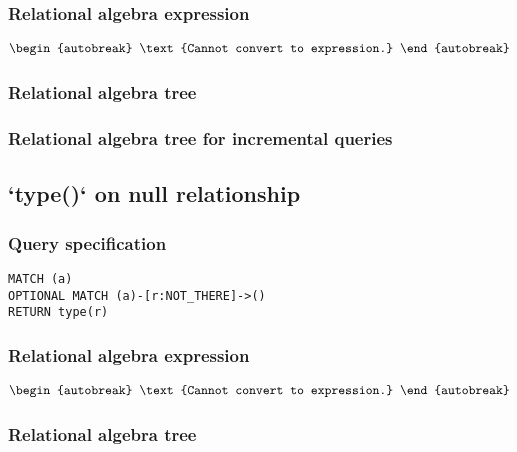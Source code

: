 \subsubsection*{Relational algebra expression}

\begin{align*}
\begin{autobreak}
\text{Cannot convert to expression.}
\end{autobreak}
\end{align*}

\subsubsection*{Relational algebra tree}


\subsubsection*{Relational algebra tree for incremental queries}


\subsection{`type()` on null relationship}

\subsubsection*{Query specification}

\begin{lstlisting}
MATCH (a)
OPTIONAL MATCH (a)-[r:NOT_THERE]->()
RETURN type(r)
\end{lstlisting}

\subsubsection*{Relational algebra expression}

\begin{align*}
\begin{autobreak}
\text{Cannot convert to expression.}
\end{autobreak}
\end{align*}

\subsubsection*{Relational algebra tree}

